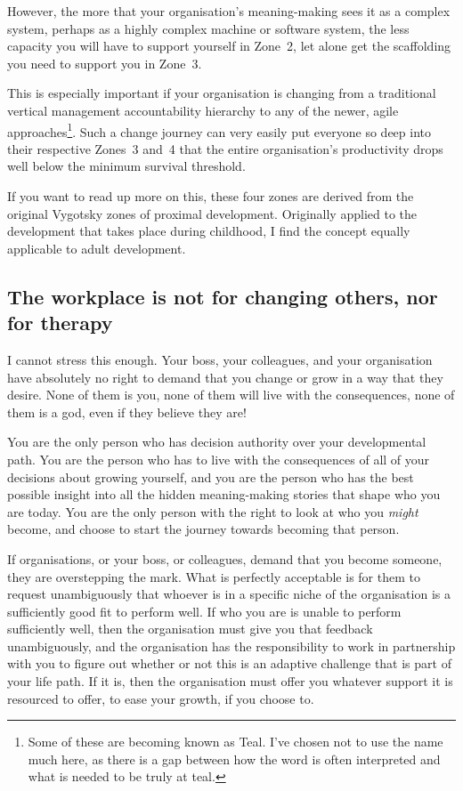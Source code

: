 However, the more that your organisation's meaning\hyp{}making sees it as a complex system, perhaps as a highly complex machine or software system, the less capacity you will have to support yourself in Zone~2, let alone get the scaffolding  you need to support you in Zone~3.


This is especially important if your organisation is changing from a traditional vertical management accountability hierarchy to any of the newer, agile approaches\footnote{Some of these are becoming known as Teal.  I’ve chosen not to use the name much here, as there is a gap between how the word is often interpreted and what is needed to be truly at teal.}. Such a change journey can very easily put everyone so deep into their respective Zones~3 and~4 that the entire organisation’s productivity drops well below the minimum survival threshold.


If you want to read up more on this, these four zones are derived from the original Vygotsky zones of proximal development\cite{vygotsky-thought, vygotsky-mind}. Originally applied to the development that takes place during childhood, I find the concept equally applicable to adult development.


\subsection{The workplace is not for changing others, nor for therapy}
I cannot stress this enough. Your boss, your colleagues, and your organisation have absolutely no right to demand that you change or grow in a way that they desire. None of them is you, none of them will live with the consequences, none of them is a god, even if they believe they are!


You are the only person who has decision authority over your developmental path. You are the person who has to live with the consequences of all of your decisions about growing yourself, and you are the person who has the best possible insight into all the hidden meaning\hyp{}making stories  that shape who you are today. You are the only person with the right to look at who you \emph{might} become, and choose to start the journey towards becoming that person.


If organisations, or your boss, or colleagues, demand that you become someone, they are overstepping the mark. What is perfectly acceptable is for them to request unambiguously that whoever is in a specific niche of the organisation is a sufficiently good fit to perform well. If who you are is unable to perform sufficiently well, then the organisation must give you that feedback unambiguously, and the organisation has the responsibility to work in partnership with you to figure out whether or not this is an adaptive challenge that is part of your life path. If it is, then the organisation must offer you whatever support it is resourced to offer, to ease your growth, if you choose to.



